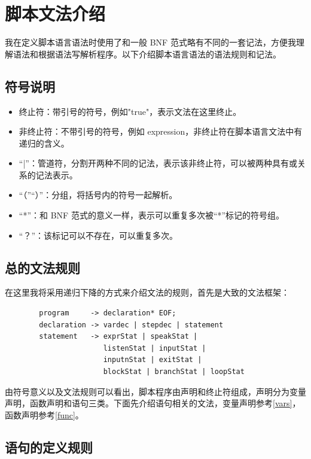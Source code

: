 \documentclass[12pt]{article}
\begin{document}
    \section{脚本文法介绍}

    我在定义脚本语言语法时使用了和一般 BNF 范式略有不同的一套记法，方便我理解语法和根据语法写解析程序。以下介绍脚本语言语法的语法规则和记法。

    \subsection{符号说明}

    \begin{itemize}
        \item 终止符：带引号的符号，例如"true"，表示文法在这里终止。
        \item 非终止符：不带引号的符号，例如 expression，非终止符在脚本语言文法中有递归的含义。
        \item“|”：管道符，分割开两种不同的记法，表示该非终止符，可以被两种具有或关系的记法表示。
        \item“（”“）”：分组，将括号内的符号一起解析。
        \item“*”：和 BNF 范式的意义一样，表示可以重复多次被“*”标记的符号组。
        \item“？”：该标记可以不存在，可以重复多次。
    \end{itemize}

    \subsection{总的文法规则}

    在这里我将采用递归下降的方式来介绍文法的规则，首先是大致的文法框架：

    \begin{verbatim}
        program     -> declaration* EOF;
        declaration -> vardec | stepdec | statement
        statement   -> exprStat | speakStat | 
                       listenStat | inputStat |
                       inputnStat | exitStat |
                       blockStat | branchStat | loopStat
    \end{verbatim}

    由符号意义以及文法规则可以看出，脚本程序由声明和终止符组成，声明分为变量声明，函数声明和语句三类。下面先介绍语句相关的文法，变量声明参考\ref{vars}，函数声明参考\ref{func}。

    \subsection{语句的定义规则}
\end{document}
